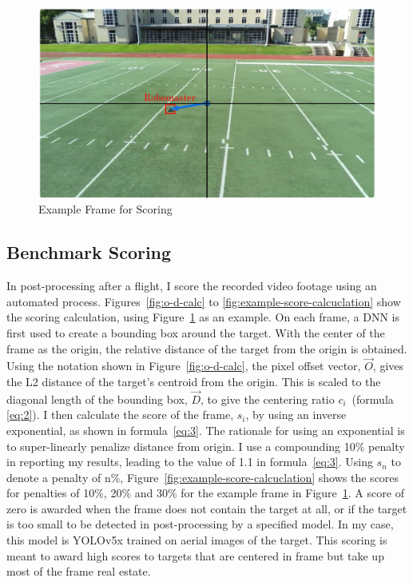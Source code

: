 \begin{figure}
\centering
\includegraphics[width=0.9\linewidth]{chapter6/FIGS/fig-tracking-score-demo.png}
\caption{Example Frame for Scoring}
\label{fig:track-score-example}
\end{figure}

\subsection{Benchmark Scoring}
\label{sec:tracking-scoring}
In post-processing after a flight, I score the recorded video footage
using an automated process.  Figures~\ref{fig:o-d-calc} to
\ref{fig:example-score-calcuclation} show the scoring calculation,
using Figure~\ref{fig:track-score-example} as an example.  On each
frame, a DNN is first used to create a bounding box around the target.
With the center of the frame as the origin, the relative distance of
the target from the origin is obtained.  Using the notation shown in
Figure~\ref{fig:o-d-calc}, the pixel offset vector, $\vec{O}$, gives
the L2 distance of the target's centroid from the origin.  This is scaled
to the diagonal length of the bounding box, $\vec{D}$, to give the
centering ratio $c_i$~(formula \ref{eq:2}).  I then calculate the
score of the frame, $s_i$, by using an inverse exponential, as shown
in formula~\ref{eq:3}.  The rationale for using an exponential is to
super-linearly penalize distance from origin.  I use a compounding
10\% penalty in reporting my results, leading to the value of 1.1 in
formula~\ref{eq:3}.  Using $s_n$ to denote a penalty of n\%,
Figure~\ref{fig:example-score-calcuclation} shows the scores for
penalties of 10\%, 20\% and 30\% for the example frame in
Figure~\ref{fig:track-score-example}.  A score of zero is awarded when
the frame does not contain the target at all, or if the target is too
small to be detected in post-processing by a specified model.  In my
case, this model is YOLOv5x trained on aerial images of the target. This scoring is meant to award high scores to targets that are centered in frame but take up most of the frame real estate.

